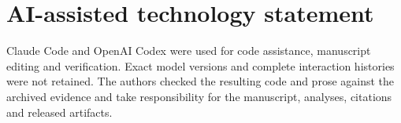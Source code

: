 \documentclass[sigconf,anonymous]{aamas}
\begin{document}

\section*{AI-assisted technology statement}
Claude Code and OpenAI Codex were used for code assistance, manuscript editing
and verification. Exact model versions and complete interaction histories were
not retained. The authors checked the resulting code and prose against the
archived evidence and take responsibility for the manuscript, analyses,
citations and released artifacts.


% 



\end{document}
